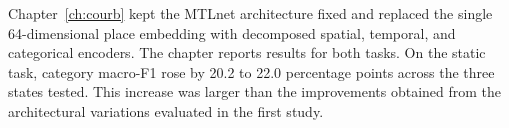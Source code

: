 Chapter~\ref{ch:courb} kept the MTLnet architecture fixed and replaced the single
64-dimensional place embedding with decomposed spatial, temporal, and categorical
encoders. The chapter reports results for both tasks. On the static task, category
macro-F1 rose by 20.2 to 22.0 percentage points across the three states tested. This
increase was larger than the improvements obtained from the architectural variations
evaluated in the first study.
